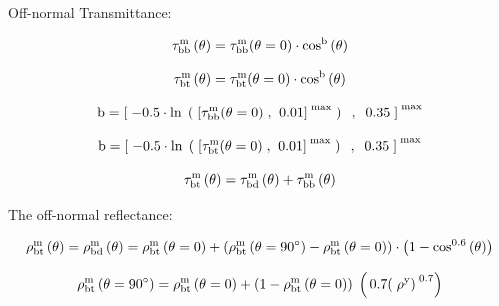 Off-normal Transmittance:

\begin{equation}
{\rm{\tau }}_{{\rm{bb}}}^{\rm{m}}\left( {\rm{\theta }} \right) = {\rm{\tau }}_{{\rm{bb}}}^{\rm{m}}{\rm{(\theta }} = {\rm{0)}} \cdot {\rm{co}}{{\rm{s}}^{\rm{b}}}\left( {\rm{\theta }} \right)
\end{equation}

\begin{equation}
{\rm{\tau }}_{{\rm{bt}}}^{\rm{m}}\left( {\rm{\theta }} \right) = {\rm{\tau }}_{{\rm{bt}}}^{\rm{m}}{\rm{(\theta }} = {\rm{0)}} \cdot {\rm{co}}{{\rm{s}}^{\rm{b}}}\left( {\rm{\theta }} \right)
\end{equation}

\begin{equation}
{\rm{b}} = {\left[ {\; - 0.5 \cdot \ln \;\left( {\;{{\left[ {{\rm{\tau }}_{{\rm{bb}}}^{\rm{m}}{\rm{(\theta }} = {\rm{0)}}\;{\rm{,}}\;\;{\rm{0}}{\rm{.01}}} \right]}^{\;\max }}\;} \right)\;\;,\;\;0.35\;} \right]^{\;\max }}
\end{equation}

\begin{equation}
{\rm{b}} = {\left[ {\; - 0.5 \cdot \ln \;\left( {\;{{\left[ {{\rm{\tau }}_{{\rm{bt}}}^{\rm{m}}{\rm{(\theta }} = {\rm{0)}}\;{\rm{,}}\;\;{\rm{0}}{\rm{.01}}} \right]}^{\;\max }}\;} \right)\;\;,\;\;0.35\;} \right]^{\;\max }}
\end{equation}

\begin{equation}
{\rm{\tau }}_{{\rm{bt}}}^{\rm{m}}\left( {\rm{\theta }} \right) = {\rm{\tau }}_{{\rm{bd}}}^{\rm{m}}\left( {\rm{\theta }} \right) + {\rm{\tau }}_{{\rm{bb}}}^{\rm{m}}\left( {\rm{\theta }} \right)
\end{equation}

The off-normal reflectance:

\begin{equation}
{\rm{\rho }}_{{\rm{bt}}}^{\rm{m}}\left( {\rm{\theta }} \right) = {\rm{\rho }}_{{\rm{bd}}}^{\rm{m}}\left( {\rm{\theta }} \right) = {\rm{\rho }}_{{\rm{bt}}}^{\rm{m}}\left( {{\rm{\theta }} = {\rm{0}}} \right) + \left( {{\rm{\rho }}_{{\rm{bt}}}^{\rm{m}}\left( {{\rm{\theta }} = 9{\rm{0}}^\circ } \right) - {\rm{\rho }}_{{\rm{bt}}}^{\rm{m}}\left( {{\rm{\theta }} = {\rm{0}}} \right)} \right) \cdot \left( {1 - {\rm{co}}{{\rm{s}}^{{\rm{0}}{\rm{.6}}}}\left( {\rm{\theta }} \right)} \right)
\end{equation}

\begin{equation}
{\rm{\rho }}_{{\rm{bt}}}^{\rm{m}}\left( {{\rm{\theta }} = {\rm{90}}^\circ } \right) = {\rm{\rho }}_{{\rm{bt}}}^{\rm{m}}\left( {{\rm{\theta }} = {\rm{0}}} \right) + \left( {{\rm{1}} - {\rm{\rho }}_{{\rm{bt}}}^{\rm{m}}\left( {{\rm{\theta }} = {\rm{0}}} \right)} \right)\;\left( {\,0.7{{\left( {\;{\rm{\rho }}_{}^{\rm{y}}} \right)}^{\;0.7}}} \right)
\end{equation}

